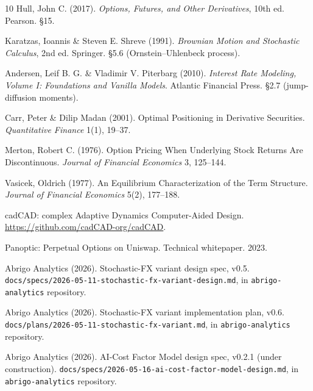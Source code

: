 \documentclass[11pt,letterpaper]{article}
\begin{document}

\nocite{abrigo-stochastic-fx-spec,abrigo-stochastic-fx-plan,abrigo-ai-cost-factor,panoptic-2023}
\begin{thebibliography}{10}
    Hull, John C. (2017). \emph{Options, Futures, and Other Derivatives},
    10th ed. Pearson. \S15.

    Karatzas, Ioannis \& Steven E. Shreve (1991).
    \emph{Brownian Motion and Stochastic Calculus},
    2nd ed. Springer. \S5.6 (Ornstein--Uhlenbeck process).

    Andersen, Leif B. G. \& Vladimir V. Piterbarg (2010).
    \emph{Interest Rate Modeling, Volume I: Foundations and Vanilla Models}.
    Atlantic Financial Press. \S2.7 (jump-diffusion moments).

    Carr, Peter \& Dilip Madan (2001).
    Optimal Positioning in Derivative Securities.
    \emph{Quantitative Finance} 1(1), 19--37.

    Merton, Robert C. (1976).
    Option Pricing When Underlying Stock Returns Are Discontinuous.
    \emph{Journal of Financial Economics} 3, 125--144.

    Vasicek, Oldrich (1977).
    An Equilibrium Characterization of the Term Structure.
    \emph{Journal of Financial Economics} 5(2), 177--188.

    cadCAD: complex Adaptive Dynamics Computer-Aided Design.
    \url{https://github.com/cadCAD-org/cadCAD}.

    Panoptic: Perpetual Options on Uniswap.
    Technical whitepaper. 2023.

    Abrigo Analytics (2026). Stochastic-FX variant design spec, v0.5.
    \texttt{docs/specs/2026-05-11-stochastic-fx-variant-design.md},
    in \texttt{abrigo-analytics} repository.

    Abrigo Analytics (2026). Stochastic-FX variant implementation plan, v0.6.
    \texttt{docs/plans/2026-05-11-stochastic-fx-variant.md},
    in \texttt{abrigo-analytics} repository.

    Abrigo Analytics (2026). AI-Cost Factor Model design spec, v0.2.1
    (under construction).
    \texttt{docs/specs/2026-05-16-ai-cost-factor-model-design.md},
    in \texttt{abrigo-analytics} repository.

\end{thebibliography}
\end{document}
